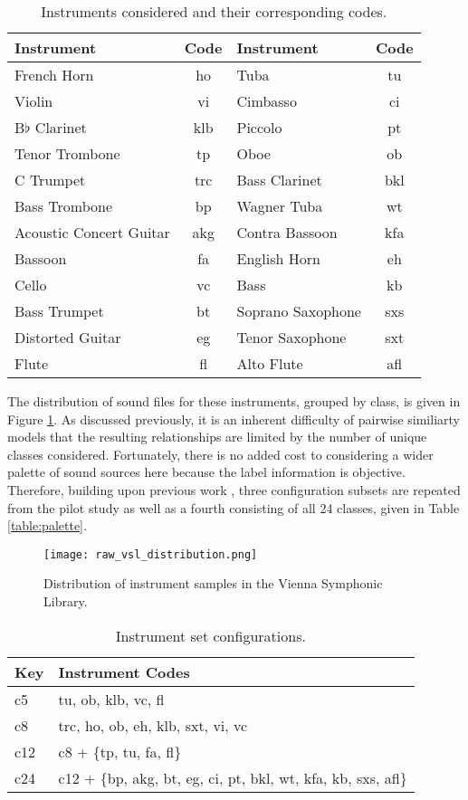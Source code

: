 \begin{table*}[t]
\begin{center}
\caption{Instruments considered and their corresponding codes.}
\begin{tabular}{l | c || l | c}
Instrument & Code & Instrument & Code \\
\hline
French Horn & ho & Tuba & tu\\
Violin & vi & Cimbasso & ci \\
B$\flat$ Clarinet & klb & Piccolo & pt \\
Tenor Trombone & tp & Oboe & ob \\
C Trumpet & trc & Bass Clarinet & bkl \\
Bass Trombone & bp & Wagner Tuba & wt \\
Acoustic Concert Guitar & akg & Contra Bassoon & kfa \\
Bassoon & fa & English Horn & eh \\
Cello & vc & Bass & kb \\
Bass Trumpet & bt & Soprano Saxophone & sxs \\
Distorted Guitar & eg & Tenor Saxophone & sxt \\
Flute & fl & Alto Flute & afl \\
\hline
\end{tabular}
\label{tab:all_insts}
\end{center}
\end{table*}


The distribution of sound files for these instruments, grouped by class, is given in Figure \ref{fig:c24_dist}.
As discussed previously, it is an inherent difficulty of pairwise similiarty models that the resulting relationships are limited by the number of unique classes considered.
Fortunately, there is no added cost to considering a wider palette of sound sources here because the label information is objective.
Therefore, building upon previous work \cite{Humphrey2011}, three configuration subsets are repeated from the pilot study as well as a fourth consisting of all 24 classes, given in Table \ref{table:palette}.

\begin{figure}[t]
\centering
\texttt{[image: raw\_vsl\_distribution.png]}
\caption{Distribution of instrument samples in the Vienna Symphonic Library.}
\label{fig:c24_dist}
\end{figure}


\begin{table*}[t]
\begin{center}
\caption{Instrument set configurations.}
\begin{tabular}{l | l }
Key & Instrument Codes \\
\hline
c5 & tu, ob, klb, vc, fl \\
c8 & trc, ho, ob, eh, klb, sxt, vi, vc \\
c12 & c8 + \{tp, tu, fa, fl\} \\
c24 & c12 + \{bp, akg, bt, eg, ci, pt, bkl, wt, kfa, kb, sxs, afl\} \\
\hline
\end{tabular}
\label{tab:palette}
\end{center}
\end{table*}

